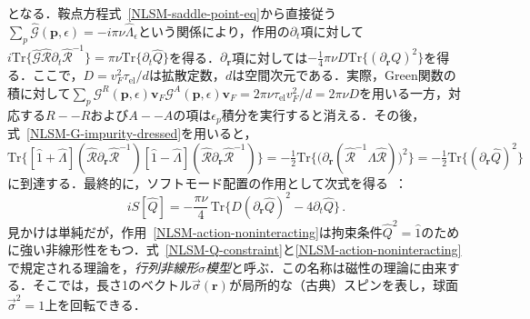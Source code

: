 \documentclass[a4paper,11pt]{ltjsarticle}
\def\Tr{\mathrm{Tr}}
\def\tauel{\tau_{\mathrm{el}}}
\begin{document}
となる．鞍点方程式~\eqref{NLSM-saddle-point-eq}から直接従う$\sum_{p}\hat{\mathcal{G}}(\mathbf{p},\epsilon)=-i\pi\nu\hat{\Lambda}_{\epsilon}$という関係により，作用の$\partial_{t}$項に対して$i\Tr\{\hat{\mathcal{G}}\hat{\mathcal{R}}\partial_{t}\hat{\mathcal{R}}^{-1}\}=
\pi\nu\Tr\{\partial_{t}\hat{Q}\}$を得る．$\partial_{\mathbf{r}}$項に対しては$-\frac{1}{4}\pi\nu D\Tr\big\{(\partial_{\mathbf{r}}
Q)^{2}\big\}$を得る．ここで，$D=v^{2}_{F}\tauel/d$は拡散定数，$d$は空間次元である．実際，Green関数の積に対して$\sum_{p}\mathcal{G}^{R}(\mathbf{p},\epsilon)\mathbf{v}_{F}
\mathcal{G}^{A}(\mathbf{p},\epsilon)\mathbf{v}_{F}=2\pi\nu\tauel
v^{2}_{F}/d=2\pi\nu D$を用いる一方，対応する$R--R$および$A--A$の項は$\epsilon_{p}$積分を実行すると消える．その後，式~\eqref{NLSM-G-impurity-dressed}を用いると，$\Tr\big\{[\hat{1}+\hat{\Lambda}]
(\hat{\mathcal{R}}\partial_{\mathbf{r}} \hat{\mathcal{R}}^{-1})
[\hat{1}-\hat{\Lambda}](\hat{\mathcal{R}}
\partial_{\mathbf{r}}\hat{\mathcal{R}}^{-1})\big\}=-\frac{1}{2}
\Tr\big\{\big(\partial_{\mathbf{r}}(\hat{\mathcal{R}}^{-1}
\hat{\Lambda}\hat{\mathcal{R}})\big)^{2}\big\}=
-\frac{1}{2}\Tr\big\{(\partial_{\mathbf{r}}\hat{Q})^{2}\big\}$に到達する．最終的に，ソフトモード配置の作用として次式を得る~\cite{HorbachSchon,KamenevAndreev,ChamonLudwigNayak}：
\begin{equation}\label{NLSM-action-noninteracting}
iS[\hat Q]=-\frac{\pi\nu}{4}\,\Tr\Big\{D(\partial_{\mathbf{r}}
\hat{Q})^{2}-4\partial_{t}\hat{Q}\Big\}\,.
\end{equation}
見かけは単純だが，作用~\eqref{NLSM-action-noninteracting}は拘束条件$\hat{Q}^{2}=\hat{1}$のために強い非線形性をもつ．式~\eqref{NLSM-Q-constraint}と\eqref{NLSM-action-noninteracting}で規定される理論を，{\em 行列非線形$\sigma$模型}と呼ぶ．この名称は磁性の理論に由来する．そこでは，長さ1のベクトル$\vec \sigma(\mathbf{r})$が局所的な（古典）スピンを表し，球面$\vec \sigma^{2}=1$上を回転できる．
\end{document}
